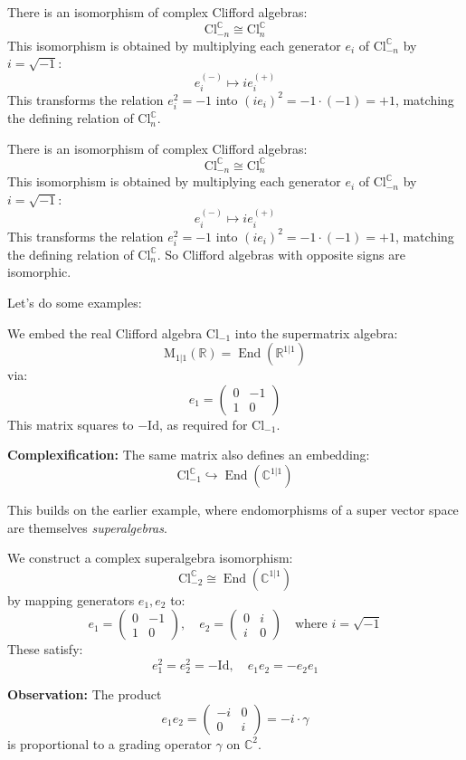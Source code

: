 \begin{example}
    There is an isomorphism of complex Clifford algebras:
\[
\mathrm{Cl}^{\mathbb{C}}_{-n} \cong \mathrm{Cl}^{\mathbb{C}}_n
\]
This isomorphism is obtained by multiplying each generator $e_i$ of $\mathrm{Cl}^{\mathbb{C}}_{-n}$ by $i = \sqrt{-1}$:
\[
e_i^{(-)} \mapsto i e_i^{(+)}
\]
This transforms the relation $e_i^2 = -1$ into $(i e_i)^2 = -1 \cdot (-1) = +1$, matching the defining relation of $\mathrm{Cl}^{\mathbb{C}}_n$.
\end{example}
There is an isomorphism of complex Clifford algebras:
\[
\mathrm{Cl}^{\mathbb{C}}_{-n} \cong \mathrm{Cl}^{\mathbb{C}}_n
\]
This isomorphism is obtained by multiplying each generator $e_i$ of $\mathrm{Cl}^{\mathbb{C}}_{-n}$ by $i = \sqrt{-1}$:
\[
e_i^{(-)} \mapsto i e_i^{(+)}
\]
This transforms the relation $e_i^2 = -1$ into $(i e_i)^2 = -1 \cdot (-1) = +1$, matching the defining relation of $\mathrm{Cl}^{\mathbb{C}}_n$. So Clifford algebras with opposite signs are isomorphic.

Let's do some examples:
\begin{example}
    We embed the real Clifford algebra $\mathrm{Cl}_{-1}$ into the supermatrix algebra:
\[
\mathrm{M}_{1|1}(\mathbb{R}) = \operatorname{End}(\mathbb{R}^{1|1})
\]
via:
\[
e_1 =
\begin{pmatrix}
0 & -1 \\
1 & 0
\end{pmatrix}
\]
This matrix squares to $-\mathrm{Id}$, as required for $\mathrm{Cl}_{-1}$.

\textbf{Complexification:} The same matrix also defines an embedding:
\[
\mathrm{Cl}^{\mathbb{C}}_{-1} \hookrightarrow \operatorname{End}(\mathbb{C}^{1|1})
\]

This builds on the earlier example, where endomorphisms of a super vector space are themselves \emph{superalgebras}.
\end{example}

\begin{example}
    We construct a complex superalgebra isomorphism:
\[
\mathrm{Cl}^{\mathbb{C}}_{-2} \cong \operatorname{End}(\mathbb{C}^{1|1})
\]
by mapping generators $e_1, e_2$ to:
\[
e_1 =
\begin{pmatrix}
0 & -1 \\
1 & 0
\end{pmatrix}, \quad
e_2 =
\begin{pmatrix}
0 & i \\
i & 0
\end{pmatrix}
\quad \text{where } i = \sqrt{-1}
\]
These satisfy:
\[
e_1^2 = e_2^2 = -\mathrm{Id}, \quad e_1 e_2 = - e_2 e_1
\]

\textbf{Observation:} The product
\[
e_1 e_2 =
\begin{pmatrix}
-i & 0 \\
0 & i
\end{pmatrix}
= -i \cdot \gamma
\]
is proportional to a grading operator $\gamma$ on $\mathbb{C}^2$.
\end{example}

